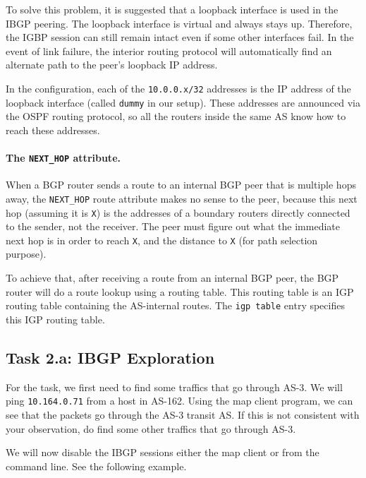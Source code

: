 To solve this problem, it is suggested that a loopback interface is used 
in the IBGP peering. The loopback interface is virtual and always stays up. 
Therefore, the IGBP session can still remain intact even if some other 
interfaces fail. In the event of link failure, the interior routing 
protocol will automatically find an alternate path to the peer's loopback
IP address. 

In the configuration, each of the \texttt{10.0.0.x/32} addresses is 
the IP address of the loopback interface (called \texttt{dummy} in our setup). 
These addresses are announced via the OSPF routing protocol, so all the 
routers inside the same AS know how to reach these addresses. 



\paragraph{The \texttt{NEXT\_HOP} attribute.}
When a BGP router sends a route to an internal BGP peer that is multiple hops
away, the \texttt{NEXT\_HOP} route attribute makes no sense to the peer, 
because this next hop (assuming it is \texttt{X}) is the addresses of a 
boundary routers directly connected to the sender, not the receiver. 
The peer must figure out what the immediate next hop is in order to reach \texttt{X}, 
and the distance to \texttt{X} (for path selection purpose). 

To achieve that, after receiving a route from an internal BGP peer,
the BGP router will do a route lookup using a routing table.
This routing table is an IGP routing table containing the AS-internal routes. 
The \texttt{igp table} entry specifies this IGP routing table. 



\subsection{Task 2.a: IBGP Exploration} 


For the task, we first need to find some traffics that 
go through AS-3. We will ping \texttt{10.164.0.71} from a host in AS-162. Using the 
map client program, we can see that the packets go through
the AS-3 transit AS. If this is not consistent with your observation,
do find some other traffics that go through AS-3. 

We will now disable the IBGP sessions either the map client or 
from the command line. See the following example.

